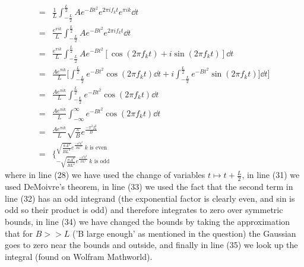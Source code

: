 \documentclass[11pt]{article}
\begin{document}
\begin{enumerate}
\begin{align}
	=& \frac{1}{L} \int_{-\frac{L}{2}}^{\frac{L}{2}} A e^{-Bt^2} e^{2 \pi i f_k t} e^{\pi i k}\dd{t} \\
	=& \frac{e^{\pi i k}}{L} \int_{-\frac{L}{2}}^{\frac{L}{2}} A e^{-Bt^2} e^{2 \pi i f_k t} \dd{t} \\
	=& \frac{e^{\pi i k}}{L} \int_{-\frac{L}{2}}^{\frac{L}{2}} A e^{-Bt^2} [\cos (2 \pi f_k t) + i \sin (2 \pi f_k t)] \dd{t} \\
	=& \frac{A e^{\pi i k}}{L} \bigg[ \int_{-\frac{L}{2}}^{\frac{L}{2}} e^{-Bt^2} \cos (2 \pi f_k t) \dd{t} + i \int_{-\frac{L}{2}}^{\frac{L}{2}} e^{-Bt^2} \sin (2 \pi f_k t)] \dd{t} \bigg] \\
	=& \frac{A e^{\pi i k}}{L} \int_{-\frac{L}{2}}^{\frac{L}{2}} e^{-Bt^2} \cos (2 \pi f_k t) \dd{t} \\
	=& \frac{A e^{\pi i k}}{L} \int_{-\infty}^{\infty} e^{-Bt^2} \cos (2 \pi f_k t) \dd{t} \\
	=& \frac{A e^{\pi i k}}{L} \sqrt{\frac{\pi}{B}} e^{\frac{-\pi^2 f_k^2}{B}} \\
	=& \bigg\{^{\sqrt{\frac{\pi A^2}{B L^2}} e^{\frac{-\pi^2 k^2}{B L^2}} \ \text{$k$ is even}}_{-\sqrt{\frac{\pi A^2}{B L^2}} e^{\frac{-\pi^2 k^2}{B L^2}} \ \text{$k$ is odd}}
	\end{align}
	where in line (28) we have used the change of variables $t \mapsto t+\frac{L}{2}$, in line (31) we used DeMoivre's theorem, in line (33) we used the fact that the second term in line (32) has an odd integrand (the exponential factor is clearly even, and sin is odd so their product is odd) and therefore integrates to zero over symmetric bounds, in line (34) we have changed the bounds by taking the approximation that for $B>>L$ ('B large enough' as mentioned in the question) the Gaussian goes to zero near the bounds and outside, and finally in line (35) we look up the integral (found on Wolfram Mathworld).
	

\end{enumerate}
\end{document}
